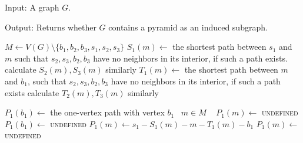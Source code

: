 \begin{alg}
	\label{alg:testPyramid}
	Input: A graph $G$.

	\noindent Output: Returns whether $G$ contains a pyramid as an induced subgraph.
\end{alg}
\begin{algorithmic}[1]
	 \label{line:pyramidTriangle}
		 \label{line:pyramidTriple}
			\label{line:a}
				\ls $M \gets V(G) \setminus \{b_1, b_2, b_3, s_1, s_2, s_3\}$
				 \label{line:pyramidSStart}
					\ls $S_1(m) \gets$ the shortest path between $s_1$ and $m$ such that
					\lsx $s_2, s_3, b_2, b_3$ have no neighbors in its interior, if such a 
					\lsx path exists.
					\ls calculate $S_2(m), S_3(m)$ similarly
					\ls $T_1(m) \gets$ the shortest path between $m$ and $b_1$, such that
					\lsx $s_2, s_3, b_2, b_3$ have no neighbors in its interior, if such a
					\lsx path exists
					\ls calculate $T_2(m), T_3(m)$ similarly
				\mEndFor \label{line:pyramidSEnd}
				 
					 
						\ls $P_1(b_1) \gets$ the one-vertex path with vertex $b_1$
						\ls \algorithmicforeach ~$m \in M$ \algorithmicdo~ $P_1(m) \gets$ \textsc{undefined}
					\mElse
						\ls $P_1(b_1) \gets $ \textsc{undefined}
								\ls $P_1(m) \gets s_1-S_1(m)-m-T_1(m)-b_1$
							\mElse
								\ls $P_1(m) \gets$ \textsc{undefined}
							\mEndIf
						\mEndFor
					\mEndIf
				

\end{algorithmic}
